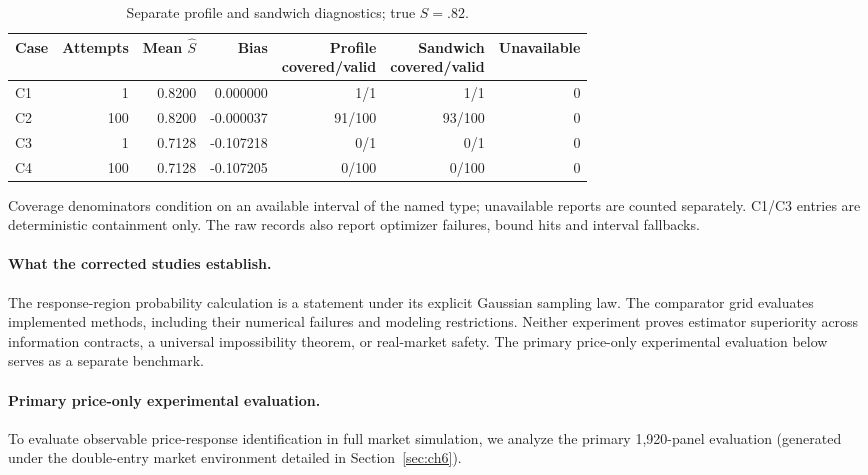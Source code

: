\documentclass[10pt,twocolumn,letterpaper]{article}
\theoremstyle{definition}
\theoremstyle{remark}
\begin{document}
\begin{table}[htbp]\centering\small
\caption{Separate profile and sandwich diagnostics; true $S=.82$.}
\label{tab:output_error_diagnostic}
\begin{tabular*}{\textwidth}{@{\extracolsep{\fill}}lrrrrrr@{}}
\toprule
Case & Attempts & Mean $\hat S$ & Bias & \shortstack{Profile\\covered/valid} & \shortstack{Sandwich\\covered/valid} & Unavailable \\
\midrule
C1 & 1 & 0.8200 & 0.000000 & 1/1 & 1/1 & 0 \\
C2 & 100 & 0.8200 & -0.000037 & 91/100 & 93/100 & 0 \\
C3 & 1 & 0.7128 & -0.107218 & 0/1 & 0/1 & 0 \\
C4 & 100 & 0.7128 & -0.107205 & 0/100 & 0/100 & 0 \\
\bottomrule\end{tabular*}
\par\smallskip\begin{minipage}{\textwidth}\footnotesize Coverage denominators condition on an available interval of the named type; unavailable reports are counted separately. C1/C3 entries are deterministic containment only. The raw records also report optimizer failures, bound hits and interval fallbacks.\end{minipage}
\end{table}

\paragraph{What the corrected studies establish.}
The response-region probability calculation is a statement under its explicit
Gaussian sampling law. The comparator grid evaluates implemented methods,
including their numerical failures and modeling restrictions. Neither
experiment proves estimator superiority across information contracts, a
universal impossibility theorem, or real-market safety. The primary price-only experimental evaluation below serves as a separate benchmark.

\paragraph{Primary price-only experimental evaluation.} To evaluate observable price-response identification in full market simulation, we analyze the primary 1,920-panel evaluation (generated under the double-entry market environment detailed in Section~\ref{sec:ch6}).
\end{document}
